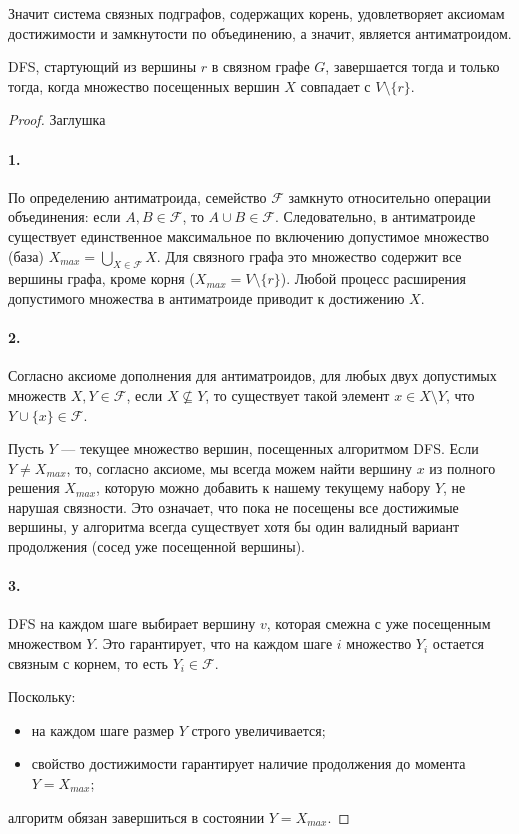 \begin{tcolorbox}[colback=gray!5!white, colframe=gray!75!black]
Значит система связных подграфов, содержащих корень, удовлетворяет аксиомам достижимости и замкнутости по объединению, а значит, является антиматроидом. 

\begin{theorem}
DFS, стартующий из вершины $r$ в связном графе $G$, завершается тогда и только тогда, когда множество посещенных вершин $X$ совпадает с $V \setminus \{r\}$.
\end{theorem}

\begin{proof}
Заглушка

\paragraph{1.} 
По определению антиматроида, семейство $\mathcal{F}$ замкнуто относительно операции объединения: если $A, B \in \mathcal{F}$, то $A \cup B \in \mathcal{F}$. 
Следовательно, в антиматроиде существует единственное максимальное по включению допустимое множество (база) $X_{max} = \bigcup_{X \in \mathcal{F}} X$. Для связного графа это множество содержит все вершины графа, кроме корня ($X_{max} = V \setminus \{r\}$). Любой процесс расширения допустимого множества в антиматроиде приводит к достижению $X$.

\paragraph{2.}
Согласно аксиоме дополнения для антиматроидов, для любых двух допустимых множеств $X, Y \in \mathcal{F}$, если $X \not\subseteq Y$, то существует такой элемент $x \in X \setminus Y$, что $Y \cup \{x\} \in \mathcal{F}$.

Пусть $Y$ — текущее множество вершин, посещенных алгоритмом DFS. Если $Y \neq X_{max}$, то, согласно аксиоме, мы всегда можем найти вершину $x$ из полного решения $X_{max}$, которую можно добавить к нашему текущему набору $Y$, не нарушая связности. Это означает, что пока не посещены все достижимые вершины, у алгоритма всегда существует хотя бы один валидный вариант продолжения (сосед уже посещенной вершины).

\paragraph{3.}
DFS на каждом шаге выбирает вершину $v$, которая смежна с уже посещенным множеством $Y$. Это гарантирует, что на каждом шаге $i$ множество $Y_i$ остается связным с корнем, то есть $Y_i \in \mathcal{F}$. 

Поскольку:
\begin{itemize}
    \item на каждом шаге размер $Y$ строго увеличивается;
    \item свойство достижимости гарантирует наличие продолжения до момента $Y = X_{max}$;
\end{itemize}
алгоритм обязан завершиться в состоянии $Y = X_{max}$.

\end{proof}
\end{tcolorbox}
\newpage
